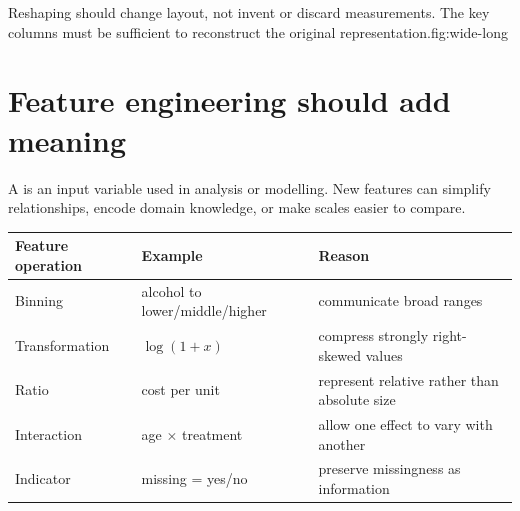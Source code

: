 \begin{utpfig}{Reshaping should change layout, not invent or discard measurements. The key columns must be sufficient to reconstruct the original representation.}{fig:wide-long}
\end{utpfig}

\section{Feature engineering should add meaning}
A  is an input variable used in analysis or modelling. New features can simplify relationships, encode domain knowledge, or make scales easier to compare.

\begin{dstable}
\begin{tabularx}{\linewidth}{@{}D{3.1cm}D{4.4cm}Y@{}}
\toprule
{}
\textbf{Feature operation} & \textbf{Example} & \textbf{Reason} \\
\midrule
Binning & alcohol to lower/middle/higher & communicate broad ranges \\
Transformation & \(\log(1+x)\) & compress strongly right-skewed values \\
Ratio & cost per unit & represent relative rather than absolute size \\
Interaction & age \(\times\) treatment & allow one effect to vary with another \\
Indicator & missing = yes/no & preserve missingness as information \\
\bottomrule
\end{tabularx}
\end{dstable}

